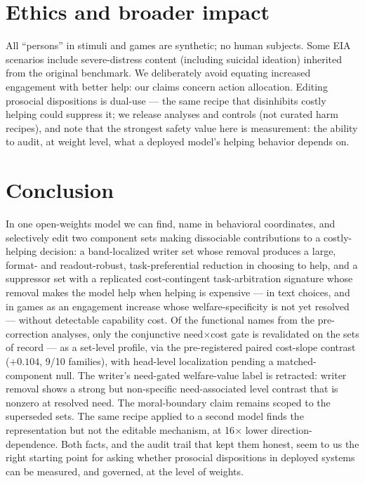 \documentclass{article}
\begin{document}
\section*{Ethics and broader impact}
All ``persons'' in stimuli and games are synthetic; no human subjects. Some
EIA scenarios include severe-distress content (including suicidal ideation)
inherited from the original benchmark. We deliberately avoid equating
increased engagement with better help: our claims concern action allocation.
Editing prosocial dispositions is dual-use — the same recipe that
disinhibits costly helping could suppress it; we release analyses and
controls (not curated harm recipes), and note that the strongest safety
value here is measurement: the ability to audit, at weight level, what a
deployed model's helping behavior depends on.

\section{Conclusion}
In one open-weights model we can find, name in behavioral coordinates, and
selectively edit two component sets making dissociable contributions to a
costly-helping decision: a band-localized writer set whose removal produces a
large, format- and readout-robust, task-preferential reduction in choosing to
help, and a suppressor set with a replicated cost-contingent task-arbitration
signature whose removal makes the model help when helping is expensive — in
text choices, and in games as an engagement increase whose welfare-specificity
is not yet resolved — without detectable capability cost. Of the functional
names from the pre-correction analyses, only the conjunctive
need$\times$cost gate is revalidated on the sets of record — as a set-level
profile, via the pre-registered paired cost-slope contrast ($+0.104$, 9/10
families), with head-level localization pending a matched-component null.
The writer's need-gated welfare-value label is retracted: writer removal
shows a strong but non-specific need-associated level contrast that is
nonzero at resolved need. The moral-boundary claim remains scoped to the
superseded sets. The same recipe applied to a second model finds the
representation but not the editable mechanism, at 16$\times$ lower
direction-dependence. Both facts, and the audit trail that kept them honest,
seem to us the right starting point for asking whether prosocial dispositions
in deployed systems can be measured, and governed, at the level of weights.



\end{document}
